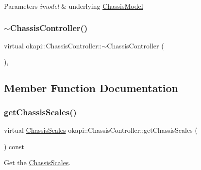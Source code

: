 \begin{DoxyParams}{Parameters}
{\em imodel} & underlying \mbox{\hyperlink{classokapi_1_1ChassisModel}{Chassis\+Model}} \\
\hline
\end{DoxyParams}
\mbox{\label{classokapi_1_1ChassisController_a886a1cfbd9430fb2fbe177bc4d4ab392}} 
\subsubsection{\texorpdfstring{$\sim$ChassisController()}{~ChassisController()}}
{\footnotesize\ttfamily virtual okapi\+::\+Chassis\+Controller\+::$\sim$\+Chassis\+Controller (\begin{DoxyParamCaption}{ }\end{DoxyParamCaption})\hspace{0.3cm}{\ttfamily [virtual]}, {\ttfamily [default]}}



\subsection{Member Function Documentation}
\mbox{\label{classokapi_1_1ChassisController_a0a8e32fc7adad8567f550954505aaa06}} 
\subsubsection{\texorpdfstring{getChassisScales()}{getChassisScales()}}
{\footnotesize\ttfamily virtual \mbox{\hyperlink{classokapi_1_1ChassisScales}{Chassis\+Scales}} okapi\+::\+Chassis\+Controller\+::get\+Chassis\+Scales (\begin{DoxyParamCaption}{ }\end{DoxyParamCaption}) const\hspace{0.3cm}{\ttfamily [pure virtual]}}

Get the \mbox{\hyperlink{classokapi_1_1ChassisScales}{Chassis\+Scales}}. 

